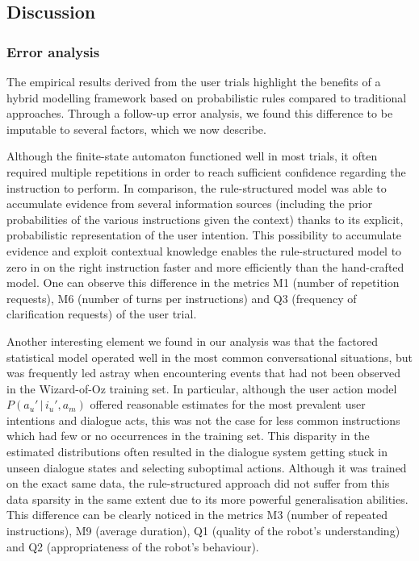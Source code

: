 \subsection{Discussion}

\subsubsection*{Error analysis}

The empirical results derived from the user trials highlight the benefits of a hybrid modelling framework based on probabilistic rules compared to traditional approaches. Through a follow-up error analysis, we found this difference to be imputable to several factors, which we now describe.

Although the finite-state automaton functioned well in most trials, it often required multiple repetitions in order to reach sufficient confidence regarding the instruction to perform.  In comparison, the rule-structured model was able to accumulate evidence from several information sources (including the prior probabilities of the various instructions given the context) thanks to its explicit, probabilistic representation of the user intention.  This possibility to accumulate evidence and exploit contextual knowledge enables the rule-structured model to zero in on the right instruction faster and more efficiently than the hand-crafted model. One can observe this difference in the metrics M1 (number of repetition requests), M6 (number of turns per instructions) and Q3 (frequency of clarification requests) of the user trial. 

Another interesting element we found in our analysis was that the factored statistical model operated well in the most common conversational situations, but was frequently led astray when encountering events that had not been observed in the Wizard-of-Oz training set. In particular, although the user action model $P(a_u'\, | \, i_u', a_m)$ offered reasonable estimates for the most prevalent user intentions and dialogue acts, this was not the case for less common instructions which had few or no occurrences in the training set.  This disparity in the estimated distributions often resulted in the dialogue system getting stuck in unseen dialogue states and selecting suboptimal actions.  Although it was trained on the exact same data, the rule-structured approach did not suffer from this data sparsity in the same extent due to its more powerful generalisation abilities. This difference can be clearly noticed in the metrics M3 (number of repeated instructions), M9 (average duration), Q1 (quality of the robot's understanding) and Q2 (appropriateness of the robot's behaviour). 

